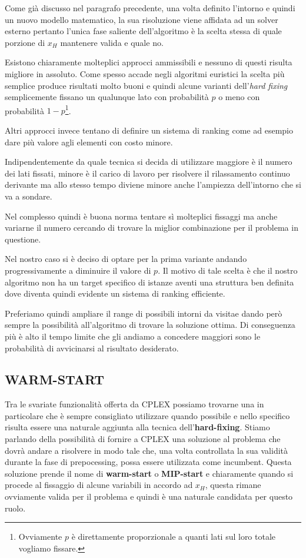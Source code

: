 \documentclass[11pt]{article}
\begin{document}
Come già discusso nel paragrafo precedente, una volta definito l'intorno e quindi un nuovo modello matematico, la sua risoluzione viene affidata ad un solver esterno pertanto l'unica fase saliente dell'algoritmo è la scelta stessa di quale porzione di $x_H$ mantenere valida e quale no. 

Esistono chiaramente molteplici approcci ammissibili e nessuno di questi risulta migliore in assoluto. Come spesso accade negli algoritmi euristici la scelta più semplice produce risultati molto buoni e quindi alcune varianti dell'\textit{hard fixing} semplicemente fissano un qualunque lato con probabilità $p$ o meno con probabilità $1-p$\footnote{Ovviamente $p$ è direttamente proporzionale a quanti lati sul loro totale vogliamo fissare.}.

Altri approcci invece tentano di definire un sistema di ranking come ad esempio dare più valore agli elementi con costo minore.

Indipendentemente da quale tecnica si decida di utilizzare maggiore è il numero dei lati fissati, minore è il carico di lavoro per risolvere il rilassamento continuo derivante ma allo stesso tempo diviene minore anche l'ampiezza dell'intorno che si va a sondare.

Nel complesso quindi è buona norma tentare sì molteplici fissaggi ma anche variarne il numero cercando di trovare la miglior combinazione per il problema in questione.

Nel nostro caso si è deciso di optare per la prima variante andando progressivamente a diminuire il valore di $p$. Il motivo di tale scelta è che il nostro algoritmo non ha un target specifico di istanze aventi una struttura ben definita dove diventa quindi evidente un sistema di ranking efficiente.

Preferiamo quindi ampliare il range di possibili intorni da visitae dando però sempre la possibilità all'algoritmo di trovare la soluzione ottima. Di conseguenza più è alto il tempo limite che gli andiamo a concedere maggiori sono le probabilità di avvicinarsi al risultato desiderato.

\subsection*{WARM-START}
\label{sec:WarmStartS}

Tra le svariate funzionalità offerta da CPLEX possiamo trovarne una in particolare che è sempre consigliato utilizzare quando possibile e nello specifico risulta essere una naturale aggiunta alla tecnica dell'\textbf{hard-fixing}. Stiamo parlando della possibilità di fornire a CPLEX una soluzione al problema che dovrà andare a risolvere in modo tale che, una volta controllata la sua validità durante la fase di prepocessing, possa essere utilizzata come incumbent. Questa soluzione prende il nome di \textbf{warm-start} o \textbf{MIP-start} e chiaramente quando si procede al fissaggio di alcune variabili in accordo ad $x_H$, questa rimane ovviamente valida per il problema e quindi è una naturale candidata per questo ruolo.
\end{document}
